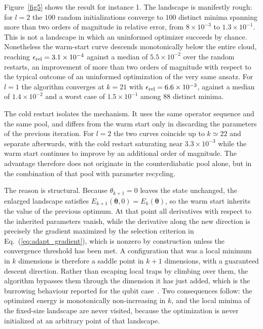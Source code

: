 Figure~\ref{fig5} shows the result for instance 1. The landscape is manifestly
rough: for $l=2$ the $100$ random initializations converge to $100$ distinct
minima spanning more than two orders of magnitude in relative error, from
$8\times10^{-3}$ to $1.3\times10^{-1}$. This is not a landscape in which an
uninformed optimizer succeeds by chance. Nonetheless the warm-start curve
descends monotonically below the entire cloud, reaching
$\epsilon_{\rm rel}=3.1\times10^{-4}$ against a median of $5.5\times10^{-2}$
over the random restarts, an improvement of more than two orders of magnitude
with respect to the typical outcome of an uninformed optimization of the very
same ansatz. For $l=1$ the algorithm converges at $k=21$ with
$\epsilon_{\rm rel}=6.6\times10^{-3}$, against a median of $1.4\times10^{-2}$
and a worst case of $1.5\times10^{-1}$ among $88$ distinct minima.

The cold restart isolates the mechanism. It uses the same operator sequence and
the same pool, and differs from the warm start only in discarding the
parameters of the previous iteration. For $l=2$ the two curves coincide up to
$k\simeq22$ and separate afterwards, with the cold restart saturating near
$3.3\times10^{-3}$ while the warm start continues to improve by an additional
order of magnitude. The advantage therefore does not originate in the
counterdiabatic pool alone, but in the combination of that pool with parameter
recycling.

The reason is structural. Because $\theta_{k+1}=0$ leaves the state unchanged,
the enlarged landscape satisfies
$E_{k+1}(\boldsymbol{\theta},0) = E_k(\boldsymbol{\theta})$, so the warm start
inherits the value of the previous optimum. At that point all derivatives with
respect to the inherited parameters vanish, while the derivative along the new
direction is precisely the gradient maximized by the selection criterion in
Eq.~(\ref{eq:adapt_gradient}), which is nonzero by construction unless the
convergence threshold has been met. A configuration that was a local minimum in
$k$ dimensions is therefore a saddle point in $k+1$ dimensions, with a
guaranteed descent direction. Rather than escaping local traps by climbing over
them, the algorithm bypasses them through the dimension it has just added,
which is the burrowing behaviour reported for the qubit
case~\cite{GrimsleynpjQuantumInf2023}. Two consequences follow: the optimized
energy is monotonically non-increasing in $k$, and the local minima of the
fixed-size landscape are never visited, because the optimization is never
initialized at an arbitrary point of that landscape.

